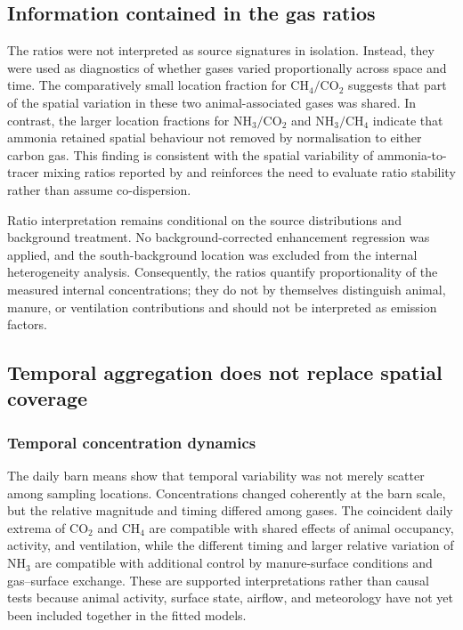 \documentclass[12pt,a4paper]{article}
\begin{document}
\subsection{Information contained in the gas ratios}

The ratios were not interpreted as source signatures in isolation. Instead,
they were used as diagnostics of whether gases varied proportionally across
space and time. The comparatively small location fraction for
\(\mathrm{CH_4}/\mathrm{CO_2}\) suggests that part of the spatial variation
in these two animal-associated gases was shared. In contrast, the larger
location fractions for \(\mathrm{NH_3}/\mathrm{CO_2}\) and
\(\mathrm{NH_3}/\mathrm{CH_4}\) indicate that ammonia retained spatial
behaviour not removed by normalisation to either carbon gas. This finding is
consistent with the spatial variability of ammonia-to-tracer mixing ratios
reported by \citet{Mendes2015} and reinforces the need to evaluate ratio
stability rather than assume co-dispersion.

Ratio interpretation remains conditional on the source distributions and
background treatment. No background-corrected enhancement regression was
applied, and the south-background location was excluded from the internal
heterogeneity analysis. Consequently, the ratios quantify proportionality of
the measured internal concentrations; they do not by themselves distinguish
animal, manure, or ventilation contributions and should not be interpreted as
emission factors.

\subsection{Temporal aggregation does not replace spatial coverage}

\subsubsection{Temporal concentration dynamics}

The daily barn means show that temporal variability was not merely scatter
among sampling locations. Concentrations changed coherently at the barn scale,
but the relative magnitude and timing differed among gases. The coincident
daily extrema of \(\mathrm{CO_2}\) and \(\mathrm{CH_4}\) are compatible
with shared effects of animal occupancy, activity, and ventilation, while the
different timing and larger relative variation of \(\mathrm{NH_3}\) are
compatible with additional control by manure-surface conditions and
gas--surface exchange. These are supported interpretations rather than causal
tests because animal activity, surface state, airflow, and meteorology have not
yet been included together in the fitted models.
\end{document}
